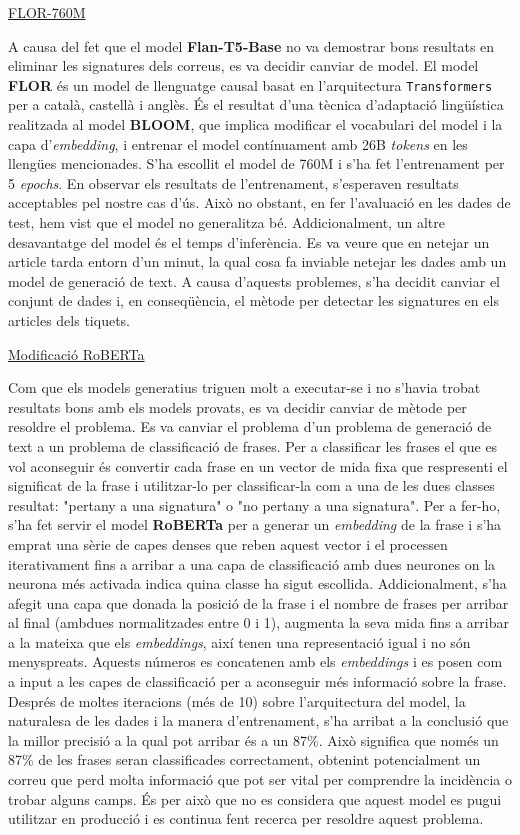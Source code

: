 \underline{FLOR-760M}

A causa del fet que el model \textbf{Flan-T5-Base} no va demostrar bons resultats en eliminar les signatures dels correus, es va decidir canviar de model. El model \textbf{FLOR} és un model de llenguatge causal basat en l'arquitectura \texttt{Transformers} per a català, castellà i anglès. És el resultat d'una tècnica d'adaptació lingüística realitzada al model \textbf{BLOOM}, que implica modificar el vocabulari del model i la capa d'\textit{embedding}, i entrenar el model contínuament amb 26B \textit{tokens} en les llengües mencionades. S'ha escollit el model de 760M i s'ha fet l'entrenament per 5 \textit{epochs}.
En observar els resultats de l'entrenament, s'esperaven resultats acceptables pel nostre cas d'ús. Això no obstant, en fer l'avaluació en les dades de test, hem vist que el model no generalitza bé. Addicionalment, un altre desavantatge del model és el temps d'inferència. Es va veure que en netejar un article tarda entorn d'un minut, la qual cosa fa inviable netejar les dades amb un model de generació de text.
A causa d'aquests problemes, s'ha decidit canviar el conjunt de dades i, en conseqüència, el mètode per detectar les signatures en els articles dels tiquets.

\underline{Modificació RoBERTa}

Com que els models generatius triguen molt a executar-se i no s'havia trobat resultats bons amb els models provats, es va decidir canviar de mètode per resoldre el problema. Es va canviar el problema d'un problema de generació de text a un problema de classificació de frases. Per a classificar les frases el que es vol aconseguir és convertir cada frase en un vector de mida fixa que respresenti el significat de la frase i utilitzar-lo per classificar-la com a una de les dues classes resultat: "pertany a una signatura" o "no pertany a una signatura". Per a fer-ho, s'ha fet servir el model \textbf{RoBERTa} per a generar un \textit{embedding} de la frase i s'ha emprat una sèrie de capes denses que reben aquest vector i el processen iterativament fins a arribar a una capa de classificació amb dues neurones on la neurona més activada indica quina classe ha sigut escollida.
Addicionalment, s'ha afegit una capa que donada la posició de la frase i el nombre de frases per arribar al final (ambdues normalitzades entre 0 i 1), augmenta la seva mida fins a arribar a la mateixa que els \textit{embeddings}, així tenen una representació igual i no són menyspreats. Aquests números es concatenen amb els \textit{embeddings} i es posen com a input a les capes de classificació per a aconseguir més informació sobre la frase.
Després de moltes iteracions (més de 10) sobre l'arquitectura del model, la naturalesa de les dades i la manera d'entrenament, s'ha arribat a la conclusió que la millor precisió a la qual pot arribar és a un 87\%. Això significa que només un 87\% de les frases seran classificades correctament, obtenint potencialment un correu que perd molta informació que pot ser vital per comprendre la incidència o trobar alguns camps. És per això que no es considera que aquest model es pugui utilitzar en producció i es continua fent recerca per resoldre aquest problema.

